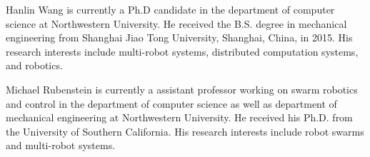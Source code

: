 \documentclass[journal]{IEEEtran}
\begin{document}
\printbibliography
\begin{IEEEbiography}{Hanlin Wang}
is currently a Ph.D candidate in the department of computer science at Northwestern University.
He received the B.S. degree in mechanical engineering from Shanghai Jiao Tong University, Shanghai, China, in 2015. His research interests include multi-robot systems, distributed computation systems, and robotics.
\end{IEEEbiography}
\begin{IEEEbiography}{Michael Rubenstein}
is currently a assistant professor 
working on swarm robotics and control in the department of computer science as well as department of mechanical engineering at Northwestern University.
He received his Ph.D. from the University of Southern
California. His research interests include robot swarms and multi-robot systems.
\end{IEEEbiography}

\end{document}
